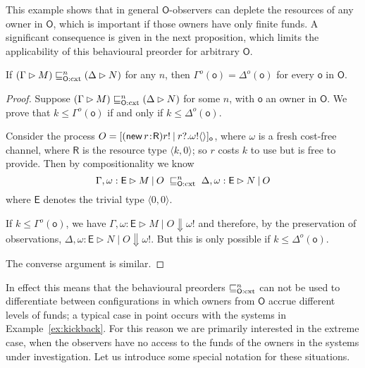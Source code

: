 \documentclass{LMCS}
\newcommand{\pfn}[1]{\mathsf{#1}}  \newcommand{\cfn}[1]{\mathsf{#1}}  \newcommand{\ownfnt}[1]{{\mathsf{#1}}}
\newcommand{\with}{\mathbin \rhd}
\newcommand{\ownO}{ {\ownfnt O}}
\newcommand{\Obscxtequiv}[2]{\mathrel{\sqsubseteq_{#1:\rm cxt}^{#2}}}
\newcommand{\Ocxtequiv}[1]{\Obscxtequiv{\ownO}{#1}}
\def\pair(#1,#2){\langle #1 , #2 \rangle}\newcommand{\parrow}{ \mathbin{\rightharpoonup}}
\newcommand{\typeletter}[1]{{\mathsf{#1}}}
\newcommand{\tR}{\typeletter{R}}
\newcommand{\tE}{\typeletter{E}}
\newcommand{\pc}[1]{\langle#1\rangle}
\newcommand{\Cassoc}[2]{ {{#1}\kern -0.2em : \kern -0.2em {#2}}}
\newcommand{\Cnew}[2]{(\mathop{\pfn{new}} \Cassoc{#1}{#2})}
\newcommand{\Cpar}{\mathbin{|}}
\newcommand{\Cloc}[2]{[#1]_{\ownfnt{#2}}}
\begin{document}
This example shows that in general $\ownfnt O$-observers  can deplete the resources of any owner
in $\ownO$, which is important if those owners have only finite funds. A significant  consequence 
is given in the next proposition, which limits the applicability of this behavioural preorder for
arbitrary $\ownO$. 
\begin{prop}\label{prop:increase}
  If $(\Gamma \with M) \Ocxtequiv{n} (\Delta \with N)$ for any $n$, then
     $\Gamma^o(\ownfnt o) =  \Delta^o(\ownfnt o)$ for every $\ownfnt o$ in $\ownO$. 
\end{prop}
\begin{proof}
  Suppose $(\Gamma \with M) \Ocxtequiv{n} (\Delta \with N)$  for
  some $n$, with $\ownfnt o$ an owner in $\ownO$.   We prove that $k \leq \Gamma^o({\ownfnt o})$ 
if and only if  $k \leq\Delta^o(\ownfnt o)$.

  Consider the process $O = \Cloc{\Cnew{r}{\tR} r! \Cpar
    r?. \omega!\pc{}}{o}$, where $\omega$ is a fresh cost-free channel, where
  $\tR$ is the resource type $\pair(k,0)$; so $r$ costs $k$ to use but
  is free to provide.  Then by compositionality we know
\begin{equation*}
  \Gamma, \omega:\tE \with M \Cpar O \;\Ocxtequiv{n}\; \Delta, \omega:\tE \with N \Cpar O
\end{equation*}
where $\tE$ denotes the trivial type $\pair(0,0)$. 

If   $k \leq \Gamma^o({\ownfnt o})$, we have 
\begin{math}
   \Gamma, \omega:\tE \with M \Cpar O  \Downarrow \omega!
\end{math}
and therefore, by the preservation of observations, 
\begin{math}
   \Delta, \omega:\tE \with N \Cpar O  \Downarrow \omega!.
\end{math}
But this is only possible if $k \leq \Delta^o({\ownfnt o})$. 

The converse argument is similar. 
\end{proof}
In effect this means that the behavioural preorders $\Ocxtequiv{n}$
can not be used to differentiate between configurations in which
owners from $\ownO$ accrue different levels of funds; a typical case
in point occurs with the systems in Example~\ref{ex:kickback}. For this
reason we are primarily interested in the extreme case, when the observers 
have no access to the funds of the owners in the systems under investigation. 
Let us introduce some special notation for these
situations.
\end{document}
